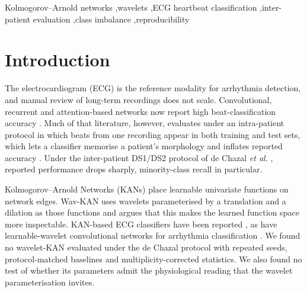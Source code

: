 \documentclass[preprint,12pt]{elsarticle}
\begin{document}
\begin{frontmatter}
\begin{keyword}
Kolmogorov--Arnold networks \sep wavelets \sep ECG heartbeat classification \sep inter-patient evaluation \sep class imbalance \sep reproducibility
\end{keyword}

\end{frontmatter}


\section{Introduction}
\label{sec:intro}

The electrocardiogram (ECG) is the reference modality for arrhythmia detection, and manual review of long-term recordings does not scale. Convolutional, recurrent and attention-based networks now report high beat-classification accuracy \cite{akan_ecgformer_2024, zhao_mak-net_2025}. Much of that literature, however, evaluates under an intra-patient protocol in which beats from one recording appear in both training and test sets, which lets a classifier memorise a patient's morphology and inflates reported accuracy \cite{bahrami_investigation_2025, xiao_deep_2023, silva_systematic_2025}. Under the inter-patient DS1/DS2 protocol of de Chazal \emph{et al.} \cite{chazal_automatic_2004}, reported performance drops sharply, minority-class recall in particular.

Kolmogorov--Arnold Networks (KANs) \cite{liu_kan_2024} place learnable univariate functions on network edges. Wav-KAN \cite{bozorgasl_wavkan_2024} uses wavelets parameterised by a translation and a dilation as those functions and argues that this makes the learned function space more inspectable. KAN-based ECG classifiers have been reported \cite{zhao_mak-net_2025}, as have learnable-wavelet convolutional networks for arrhythmia classification \cite{kim_wavelnet_2023}. We found no wavelet-KAN evaluated under the de Chazal protocol with repeated seeds, protocol-matched baselines and multiplicity-corrected statistics. We also found no test of whether its parameters admit the physiological reading that the wavelet parameterisation invites.
\end{document}
